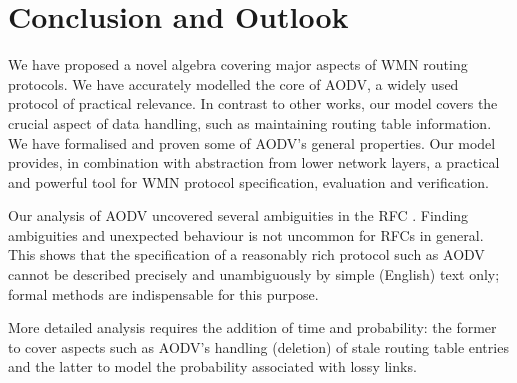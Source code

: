 \documentclass[envcountsame,envcountsect,orivec,runningheads]{llncs}
\begin{document}
\section{Conclusion and Outlook}\label{sec:conclusion}


We have proposed a novel algebra covering major aspects of WMN routing
protocols.  We have accurately modelled the core of AODV, a widely
used protocol of practical relevance.  In contrast to other works, our
model covers the crucial aspect of data handling, such as maintaining
routing table information.  We have formalised and proven some of
AODV's general properties.  Our model provides, in combination with
abstraction from lower network layers, a practical and powerful tool
for WMN protocol specification, evaluation and verification.

Our analysis of AODV uncovered several ambiguities in the RFC
\cite{rfc3561}.  Finding ambiguities and unexpected behaviour is not
uncommon for RFCs in general. This shows that the specification of a
reasonably rich protocol such as AODV cannot be described precisely
and unambiguously by simple (English) text only; formal methods are
indispensable for this purpose.

More detailed analysis requires the addition of time and probability:
the former to cover aspects such as AODV's handling (deletion) of
stale routing table entries and the latter to model the probability
associated with lossy links.



\end{document}
